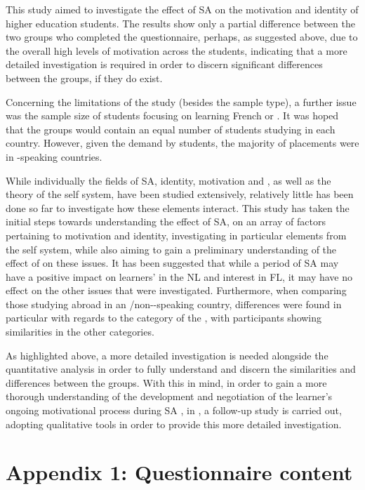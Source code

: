 \documentclass[output=paper]{langsci/langscibook}
\begin{document}
This study aimed to investigate the effect of SA on the motivation and identity of higher education students. The results show only a partial difference between the two groups who completed the questionnaire, perhaps, as suggested above, due to the overall high levels of motivation across the students, indicating that a more detailed investigation is required in order to discern significant differences between the groups, if they do exist.

Concerning the limitations of the study (besides the sample type), a further issue was the sample size of students focusing on learning French or . It was hoped that the groups would contain an equal number of students studying in each country. However, given the demand by students, the majority of placements were in -speaking countries.

While individually the fields of SA, identity, motivation and , as well as the theory of the   self system, have been studied extensively, relatively little has been done so far to investigate how these elements interact. This study has taken the initial steps towards understanding the effect of SA, on an array of factors pertaining to motivation and identity, investigating in particular elements from the   self system, while also aiming to gain a preliminary understanding of the effect of  on these issues. It has been suggested that while a period of SA may have a positive impact on learners'  in the NL and interest in FL, it may have no effect on the other issues that were investigated. Furthermore, when comparing those studying abroad in an /non--speaking country, differences were found in particular with regards to the category of the , with participants showing similarities in the other categories.

\newpage 
As highlighted above, a more detailed investigation is needed alongside the quantitative analysis in order to fully understand and discern the similarities and differences between the groups. With this in mind, in order to gain a more thorough understanding of the development and negotiation of the learner’s ongoing motivational process during SA \citep{Kim2009}, in \citet{GeogheganPerezVidalForthcoming}, a follow-up study is carried out, adopting qualitative tools in order to provide this more detailed investigation. 
 
\section*{Appendix 1: Questionnaire content}
\sloppy 
\end{document}
